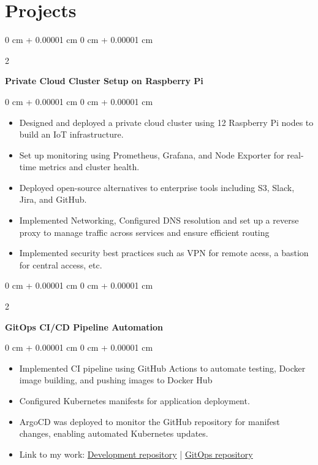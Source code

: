 \documentclass[10pt, letterpaper]{article}
\newenvironment{highlights}{
    \begin{itemize}[
        topsep=0.10 cm,
        parsep=0.10 cm,
        partopsep=0pt,
        itemsep=0pt,
        leftmargin=0 cm + 10pt
    ]
}{
    \end{itemize}
} %
\newenvironment{onecolentry}{
    \begin{adjustwidth}{
        0 cm + 0.00001 cm
    }{
        0 cm + 0.00001 cm
    }
}{
    \end{adjustwidth}
} %
\newenvironment{twocolentry}[2][]{
    \onecolentry
    \def\secondColumn{#2}
    \setcolumnwidth{\fill, 4.5 cm}
    \begin{paracol}{2}
}{
    \switchcolumn \raggedleft \secondColumn
    \end{paracol}
    \endonecolentry
} %
\begin{document}
    \section{Projects}

        \begin{twocolentry}{
        }
            \textbf{Private Cloud Cluster Setup on Raspberry Pi}\end{twocolentry}

        \vspace{0.10 cm}
        \begin{onecolentry}
            \begin{highlights}
                \item Designed and deployed a private cloud cluster using 12 Raspberry Pi nodes to build an IoT infrastructure.
                \item Set up monitoring using Prometheus, Grafana, and Node Exporter for real-time metrics and cluster health.
                \item Deployed open-source alternatives to enterprise tools including S3, Slack, Jira, and GitHub.
                \item Implemented Networking, Configured DNS resolution and set up a reverse proxy to manage traffic across services and ensure efficient routing
                \item Implemented security best practices such as VPN for remote acess, a bastion for central access, etc.
            \end{highlights}
        \end{onecolentry}


        \vspace{0.2 cm}

        \begin{twocolentry}{
        }
            \textbf{GitOps CI/CD Pipeline Automation}\end{twocolentry}

        \vspace{0.10 cm}
        \begin{onecolentry}
            \begin{highlights}
                \item Implemented CI pipeline using GitHub Actions to automate testing, Docker image building, and pushing images to Docker Hub
                \item Configured Kubernetes manifests for application deployment.
                \item ArgoCD was deployed to monitor the GitHub repository for manifest changes, enabling automated Kubernetes updates.
                \item Link to my work: \href{https://github.com/Charan-Sharan/CRUD}{Development repository} | \href{https://github.com/Charan-Sharan/gitops}{GitOps repository}
            \end{highlights}
        \end{onecolentry}
\end{document}
